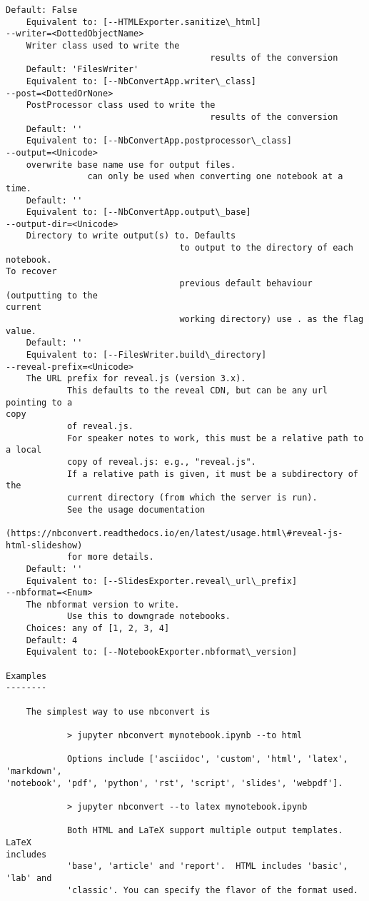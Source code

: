 \documentclass[11pt]{article}
\begin{document}
\begin{Verbatim}[commandchars=\\\{\}]
    Default: False
    Equivalent to: [--HTMLExporter.sanitize\_html]
--writer=<DottedObjectName>
    Writer class used to write the
                                        results of the conversion
    Default: 'FilesWriter'
    Equivalent to: [--NbConvertApp.writer\_class]
--post=<DottedOrNone>
    PostProcessor class used to write the
                                        results of the conversion
    Default: ''
    Equivalent to: [--NbConvertApp.postprocessor\_class]
--output=<Unicode>
    overwrite base name use for output files.
                can only be used when converting one notebook at a time.
    Default: ''
    Equivalent to: [--NbConvertApp.output\_base]
--output-dir=<Unicode>
    Directory to write output(s) to. Defaults
                                  to output to the directory of each notebook.
To recover
                                  previous default behaviour (outputting to the
current
                                  working directory) use . as the flag value.
    Default: ''
    Equivalent to: [--FilesWriter.build\_directory]
--reveal-prefix=<Unicode>
    The URL prefix for reveal.js (version 3.x).
            This defaults to the reveal CDN, but can be any url pointing to a
copy
            of reveal.js.
            For speaker notes to work, this must be a relative path to a local
            copy of reveal.js: e.g., "reveal.js".
            If a relative path is given, it must be a subdirectory of the
            current directory (from which the server is run).
            See the usage documentation
            (https://nbconvert.readthedocs.io/en/latest/usage.html\#reveal-js-
html-slideshow)
            for more details.
    Default: ''
    Equivalent to: [--SlidesExporter.reveal\_url\_prefix]
--nbformat=<Enum>
    The nbformat version to write.
            Use this to downgrade notebooks.
    Choices: any of [1, 2, 3, 4]
    Default: 4
    Equivalent to: [--NotebookExporter.nbformat\_version]

Examples
--------

    The simplest way to use nbconvert is

            > jupyter nbconvert mynotebook.ipynb --to html

            Options include ['asciidoc', 'custom', 'html', 'latex', 'markdown',
'notebook', 'pdf', 'python', 'rst', 'script', 'slides', 'webpdf'].

            > jupyter nbconvert --to latex mynotebook.ipynb

            Both HTML and LaTeX support multiple output templates. LaTeX
includes
            'base', 'article' and 'report'.  HTML includes 'basic', 'lab' and
            'classic'. You can specify the flavor of the format used.


\end{Verbatim}
\end{document}
